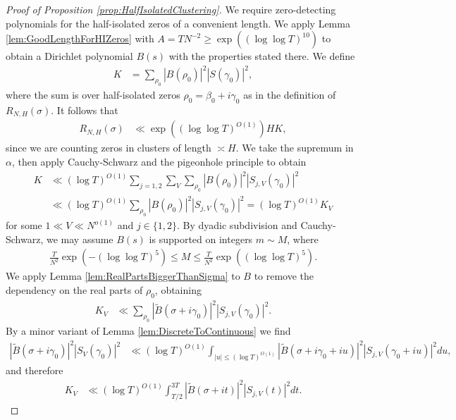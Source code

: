\documentclass[12pt]{amsart}
\theoremstyle{plain}
\theoremstyle{definition}
\theoremstyle{remark}
\begin{document}
\begin{proof}[Proof of Proposition \ref{prop:HalfIsolatedClustering}]
We require zero-detecting polynomials for the half-isolated zeros of a convenient length. We apply Lemma \ref{lem:GoodLengthForHIZeros} with $A = T N^{-2} \geq \exp((\log \log T)^{10})$ to obtain a Dirichlet polynomial $B(s)$ with the properties stated there. We define
\begin{align*}
K &= \sum_{\rho_0} |B(\rho_0)|^2 |S(\gamma_0)|^2,
\end{align*}
where the sum is over half-isolated zeros $\rho_0 = \beta_0 + i\gamma_0$ as in the definition of $R_{N,H}(\sigma)$. It follows that
\begin{align}\label{eqn:BoundRNHbyK}
R_{N,H}(\sigma) &\ll \exp((\log \log T)^{O(1)}) H K,
\end{align}
since we are counting zeros in clusters of length $\asymp H$. We take the supremum in $\alpha$, then apply Cauchy-Schwarz and the pigeonhole principle to obtain
\begin{align*}
K &\ll (\log T)^{O(1)} \sum_{j=1,2}\sum_V\sum_{\rho_0} |B(\rho_0)|^2 |S_{j,V}(\gamma_0)|^2 \\ 
&\ll (\log T)^{O(1)} \sum_{\rho_0} |B(\rho_0)|^2 |S_{j,V}(\gamma_0)|^2 = (\log T)^{O(1)} K_V
\end{align*}
for some $1\ll V \ll N^{o(1)}$ and $j\in\{1,2\}$. By dyadic subdivision and Cauchy-Schwarz, we may assume $B(s)$ is supported on integers $m \sim M$, where
\begin{align*}
\frac{T}{N^2}\exp(-(\log \log T)^{5}) \leq M \leq \frac{T}{N^2} \exp((\log \log T)^{5}).
\end{align*}
We apply Lemma \ref{lem:RealPartsBiggerThanSigma} to $B$ to remove the dependency on the real parts of $\rho_0$, obtaining
\begin{align*}
K_V &\ll \sum_{\rho_0} |\tilde{B}(\sigma+i\gamma_0)|^2 |S_{j,V}(\gamma_0)|^2.
\end{align*}
By a minor variant of Lemma \ref{lem:DiscreteToContinuous} we find
\begin{align*}
|\tilde{B}(\sigma+i\gamma_0)|^2 |S_V(\gamma_0)|^2 &\ll (\log T)^{O(1)} \int_{|u|\leq (\log T)^{O(1)}} |\tilde{B}(\sigma+i\gamma_0+iu)|^2 |S_{j,V}(\gamma_0+iu)|^2 du,
\end{align*}
and therefore
\begin{align*}
K_V &\ll (\log T)^{O(1)} \int_{T/2}^{3T}|\tilde{B}(\sigma+it)|^2 |S_{j,V}(t)|^2 dt.
\end{align*}


\end{proof}
\end{document}
